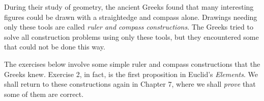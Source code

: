 \documentclass[11pt]{book}
\theoremstyle{bkplain}
\theoremstyle{XIplainnote}
\theoremstyle{bkplain}
\theoremstyle{bkplain}
\begin{document}
During their study of geometry, the ancient Greeks found that many interesting
figures could be drawn with a straightedge and compass alone. Drawings needing
only these tools are called \emph{ruler and compass constructions}. The Greeks
tried to solve all construction problems using only these tools, but they
encountered some that could not be done this way.

The exercises below involve some simple ruler and compass constructions that the
Greeks knew. Exercise 2, in fact, is the first proposition in Euclid's
\emph{Elements}. We shall return to these constructions again in Chapter 7, where
we shall \emph{prove} that some of them are correct.

\end{document}
